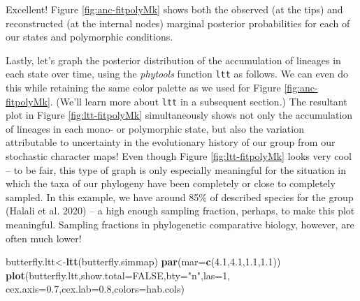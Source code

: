 \documentclass[fleqn,10pt,lineno]{wlpeerj} %
\newenvironment{Shaded}{\begin{snugshade}}{\end{snugshade}}
\newcommand{\AttributeTok}[1]{\textcolor[rgb]{0.13,0.29,0.53}{#1}}
\newcommand{\ConstantTok}[1]{\textcolor[rgb]{0.56,0.35,0.01}{#1}}
\newcommand{\DecValTok}[1]{\textcolor[rgb]{0.00,0.00,0.81}{#1}}
\newcommand{\FloatTok}[1]{\textcolor[rgb]{0.00,0.00,0.81}{#1}}
\newcommand{\FunctionTok}[1]{\textcolor[rgb]{0.13,0.29,0.53}{\textbf{#1}}}
\newcommand{\NormalTok}[1]{#1}
\newcommand{\OtherTok}[1]{\textcolor[rgb]{0.56,0.35,0.01}{#1}}
\newcommand{\StringTok}[1]{\textcolor[rgb]{0.31,0.60,0.02}{#1}}
\begin{document}
Excellent! Figure \ref{fig:anc-fitpolyMk} shows both the observed (at the tips) and reconstructed (at the internal nodes) marginal posterior probabilities for each of our states and polymorphic conditions.

Lastly, let's graph the posterior distribution of the accumulation of lineages in each state over time, using the \emph{phytools} function \texttt{ltt} as follows. We can even do this while retaining the same color palette as we used for Figure \ref{fig:anc-fitpolyMk}. (We'll learn more about \texttt{ltt} in a subsequent section.) The resultant plot in Figure \ref{fig:ltt-fitpolyMk} simultaneously shows not only the accumulation of lineages in each mono- or polymorphic state, but also the variation attributable to uncertainty in the evolutionary history of our group from our stochastic character maps! Even though Figure \ref{fig:ltt-fitpolyMk} looks very cool -- to be fair, this type of graph is only especially meaningful for the situation in which the taxa of our phylogeny have been completely or close to completely sampled. In this example, we have around 85\% of described species for the group (Halali et al. 2020) -- a high enough sampling fraction, perhaps, to make this plot meaningful. Sampling fractions in phylogenetic comparative biology, however, are often much lower!

\begin{Shaded}
\begin{Highlighting}[]
\NormalTok{butterfly.ltt}\OtherTok{\textless{}{-}}\FunctionTok{ltt}\NormalTok{(butterfly.simmap)}
\FunctionTok{par}\NormalTok{(}\AttributeTok{mar=}\FunctionTok{c}\NormalTok{(}\FloatTok{4.1}\NormalTok{,}\FloatTok{4.1}\NormalTok{,}\FloatTok{1.1}\NormalTok{,}\FloatTok{1.1}\NormalTok{))}
\FunctionTok{plot}\NormalTok{(butterfly.ltt,}\AttributeTok{show.total=}\ConstantTok{FALSE}\NormalTok{,}\AttributeTok{bty=}\StringTok{"n"}\NormalTok{,}\AttributeTok{las=}\DecValTok{1}\NormalTok{,}
  \AttributeTok{cex.axis=}\FloatTok{0.7}\NormalTok{,}\AttributeTok{cex.lab=}\FloatTok{0.8}\NormalTok{,}\AttributeTok{colors=}\NormalTok{hab.cols)}
\end{Highlighting}
\end{Shaded}
\end{document}
